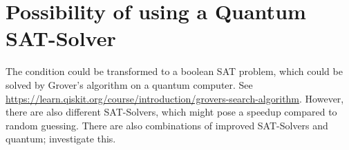 \documentclass[18pt,a4paper]{extarticle}
\begin{document}
\section{Possibility of using a Quantum SAT-Solver}

The condition could be transformed to a boolean SAT problem, which could be solved by Grover's algorithm on a quantum computer.
See \url{https://learn.qiskit.org/course/introduction/grovers-search-algorithm}.
However, there are also different SAT-Solvers, which might pose a speedup compared to random guessing.
There are also combinations of improved SAT-Solvers and quantum; investigate this.
\end{document}

